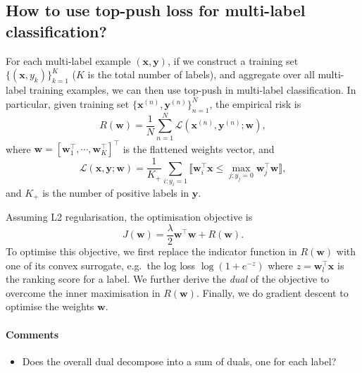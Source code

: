 \documentclass[9pt]{extarticle}
\newcommand{\llb}{\llbracket}
\newcommand{\rrb}{\rrbracket}
\newcommand{\x}{\mathbf{x}}
\newcommand{\y}{\mathbf{y}}
\newcommand{\1}{\mathbf{1}}
\newcommand{\w}{\mathbf{w}}
\newcommand{\LCal}{\mathcal{L}}
\newcommand{\pb}[1]{^{({#1})}}
\newcommand{\eg}{e.g.\ }
\begin{document}
\subsection*{How to use top-push loss for multi-label classification?}

For each multi-label example $(\x, \y)$, if we construct a training set $\{(\x, y_k)\}_{k=1}^K$ ($K$ is the total number of labels),
and aggregate over all multi-label training examples, we can then use top-push in multi-label classification. 
In particular, given training set $\{\x\pb{n}, \y\pb{n}\}_{n=1}^N$, the empirical risk is
\begin{equation*}
R(\w) = \frac{1}{N} \sum_{n=1}^N \LCal(\x\pb{n}, \y\pb{n}; \w),
\end{equation*}
where $\w = [\w_1^\top, \cdots, \w_K^\top]^\top$ is the flattened weights vector, and
\begin{equation}
\LCal(\x, \y; \w) = \frac{1}{K_+} \sum_{i:y_i=1} \llb \w_i^\top \x \le \underset{j:y_j=0}{\max} \w_j^\top \w \rrb,
\end{equation}
and $K_+$ is the number of positive labels in $\y$.


Assuming L2 regularisation, the optimisation objective is
\begin{equation*}
J(\w) = \frac{\lambda}{2}\w^\top \w + R(\w).
\end{equation*}
To optimise this objective, we first replace the indicator function in $R(\w)$ with one of its convex surrogate, 
\eg the log loss $\log(1+e^{-z})$ where $z = \w_l^\top \x$ is the ranking score for a label.
We further derive the \emph{dual} of the objective to overcome the inner maximisation in $R(\w)$.
Finally, we do gradient descent to optimise the weights $\w$.

\paragraph{Comments}
{\it
\begin{itemize}
\item Does the overall dual decompose into a sum of duals, one for each label?
\end{itemize}
}
\end{document}
